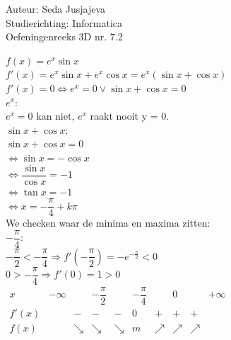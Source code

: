 \documentclass[a4paper]{article}
\begin{document}
\noindent \large Auteur: Seda Jusjajeva\\
\noindent \large Studierichting: Informatica\\
\noindent \large Oefeningenreeks 3D nr. 7.2 \\

\medskip

\normalsize


$f(x) = e^x\sin x$ \\

$f'(x) = e^x\sin x + e^x\cos x = e^x\left(\sin x + \cos x\right)$ \\

$f'(x) = 0 \Leftrightarrow e^{x} = 0\vee\sin x + \cos x = 0$ \\

$e^x$: \\

$e^{x} = 0$ kan niet, $e^x$ raakt nooit y = 0. \\

$\sin x + \cos x$: \\

$\sin x + \cos x = 0$ \\

$\Leftrightarrow \sin x = -\cos x$ \\

$\Leftrightarrow \dfrac{\sin x}{\cos x} = -1$ \\

$\Leftrightarrow \tan x = -1$ \\

$\Leftrightarrow x = -\dfrac{\pi}{4} + k\pi$ \\

We checken waar de minima en maxima zitten: \\

$-\dfrac{\pi}{4}$: \\

$-\dfrac{\pi}{2} < -\dfrac{\pi}{4} \Rightarrow f'\left(-\dfrac{\pi}{2}\right) = -e^{-\tfrac{\pi}{2}} < 0$ \\

$0 > -\dfrac{\pi}{4} \Rightarrow f'(0) = 1 > 0$ \\

$\begin{array}{r|ccccccccc}
x     & -\infty &          & -\dfrac{\pi}{2} &          & -\dfrac{\pi}{4} &          & 0        &          & +\infty \\ 
\hline
f'(x) &         & -        & -               & -        & 0               & +        & +        & +        &\\ 
f(x)  &         & \searrow & \searrow        & \searrow & m               & \nearrow & \nearrow & \nearrow &\\
\end{array}$ \\
\end{document}
